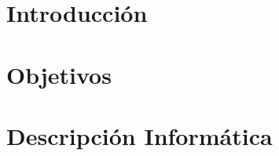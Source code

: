 \documentclass[12pt,twoside,titlepage]{report}
\newcommand\blankpage{%
    \newpage
    \null
    \thispagestyle{empty}%
    \newpage}
\begin{document}






\pagestyle{fancy}


\renewcommand{\chaptermark}[1]{\markboth{Capítulo \thechapter.\ #1}{}}

\pagestyle{fancy}
\fancyhf{}
\fancyhead[LO]{\leftmark}
\fancyhead[RO]{}
\fancyhead[RE]{\nouppercase\rightmark}
\fancyhead[LE]{}
\fancyfoot[C]{\thepage}










\chapter{Introducción}



\pagestyle{fancy}


\setlength{\parskip}{0.75em}
\renewcommand{\baselinestretch}{1.5}
\setcounter{page}{1}






\chapter{Objetivos}



\blankpage

\chapter{Descripción Informática}
\label{chap:contenidos}
\end{document}
